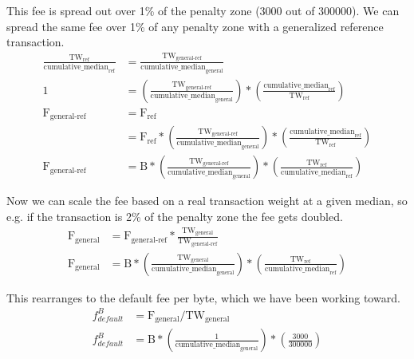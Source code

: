 This fee is spread out over 1\% of the penalty zone (3000 out of 300000). We can spread the same fee over 1\% of any penalty zone with a generalized reference transaction.\vspace{.175cm}
\begin{align*}
    \frac{\textrm{TW}_{\textrm{ref}}}{\textrm{cumulative\_median}_{\textrm{ref}}} &= \frac{\textrm{TW}_{\textrm{general-ref}}}{\textrm{cumulative\_median}_{\textrm{general}}}\\
    1 &= (\frac{\textrm{TW}_{\textrm{general-ref}}}{\textrm{cumulative\_median}_{\textrm{general}}}) * (\frac{\textrm{cumulative\_median}_{\textrm{ref}}}{\textrm{TW}_{\textrm{ref}}})\\
    \textrm{F}_{\textrm{general-ref}} &= \textrm{F}_{\textrm{ref}}\\
    &= \textrm{F}_{\textrm{ref}}*(\frac{\textrm{TW}_{\textrm{general-ref}}}{\textrm{cumulative\_median}_{\textrm{general}}}) * (\frac{\textrm{cumulative\_median}_{\textrm{ref}}}{\textrm{TW}_{\textrm{ref}}})\\
    \textrm{F}_{\textrm{general-ref}} &= \textrm{B}*(\frac{\textrm{TW}_{\textrm{general-ref}}}{\textrm{cumulative\_median}_{\textrm{general}}}) * (\frac{\textrm{TW}_{\textrm{ref}}}{\textrm{cumulative\_median}_{\textrm{ref}}})
\end{align*}{}

Now we can scale the fee based on a real transaction weight at a given median, so e.g. if the transaction is 2\% of the penalty zone the fee gets doubled.\vspace{.175cm}
\begin{align*}
    \textrm{F}_{\textrm{general}} &= \textrm{F}_{\textrm{general-ref}} * \frac{\textrm{TW}_{\textrm{general}}}{\textrm{TW}_{\textrm{general-ref}}}\\
    \textrm{F}_{\textrm{general}} &= \textrm{B}*(\frac{\textrm{TW}_{\textrm{general}}}{\textrm{cumulative\_median}_{\textrm{general}}}) * (\frac{\textrm{TW}_{\textrm{ref}}}{\textrm{cumulative\_median}_{\textrm{ref}}})
\end{align*}{}

This rearranges to the default fee per byte, which we have been working toward.\vspace{.175cm}
\begin{align*}
    f^{B}_{default} &= \textrm{F}_{\textrm{general}}/\textrm{TW}_{\textrm{general}}\\
    f^{B}_{default} &= \textrm{B}*(\frac{1}{\textrm{cumulative\_median}_{\textrm{general}}}) * (\frac{3000}{300000})
\end{align*}{}

